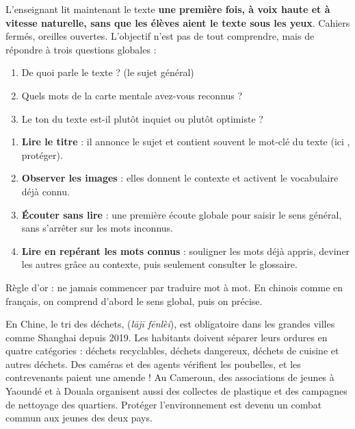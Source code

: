\documentclass[11pt]{article}
\newcommand{\zh}[1]{\ifmmode\text{#1}\else{#1}\fi}
\begin{document}
L'enseignant lit maintenant le texte \textbf{une première fois, à voix haute et à vitesse naturelle, sans que les élèves aient le texte sous les yeux}. Cahiers fermés, oreilles ouvertes. L'objectif n'est pas de tout comprendre, mais de répondre à trois questions globales :

\begin{enumerate}
\item De quoi parle le texte ? (le sujet général)
\item Quels mots de la carte mentale avez-vous reconnus ?
\item Le ton du texte est-il plutôt inquiet ou plutôt optimiste ?
\end{enumerate}

\begin{methode}
\begin{enumerate}
\item \textbf{Lire le titre} : il annonce le sujet et contient souvent le mot-clé du texte (ici \zh{保护}, protéger).
\item \textbf{Observer les images} : elles donnent le contexte et activent le vocabulaire déjà connu.
\item \textbf{Écouter sans lire} : une première écoute globale pour saisir le sens général, sans s'arrêter sur les mots inconnus.
\item \textbf{Lire en repérant les mots connus} : souligner les mots déjà appris, deviner les autres grâce au contexte, puis seulement consulter le glossaire.
\end{enumerate}
Règle d'or : ne jamais commencer par traduire mot à mot. En chinois comme en français, on comprend d'abord le sens global, puis on précise.
\end{methode}

\begin{savaistu}
En Chine, le tri des déchets, \zh{垃圾分类} (\emph{lājī fēnlèi}), est obligatoire dans les grandes villes comme Shanghai depuis 2019. Les habitants doivent séparer leurs ordures en quatre catégories : déchets recyclables, déchets dangereux, déchets de cuisine et autres déchets. Des caméras et des agents vérifient les poubelles, et les contrevenants paient une amende ! Au Cameroun, des associations de jeunes à Yaoundé et à Douala organisent aussi des collectes de plastique et des campagnes de nettoyage des quartiers. Protéger l'environnement est devenu un combat commun aux jeunes des deux pays.
\end{savaistu}
\end{document}
